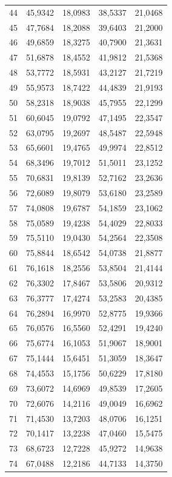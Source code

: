 \begin{small}
\begin{longtable}{rrrrr}
44 & 45,9342 & 18,0983 & 38,5337 & 21,0468 \\
45 & 47,7684 & 18,2088 & 39,6403 & 21,2000 \\
46 & 49,6859 & 18,3275 & 40,7900 & 21,3631 \\
47 & 51,6878 & 18,4552 & 41,9812 & 21,5368 \\
48 & 53,7772 & 18,5931 & 43,2127 & 21,7219 \\
49 & 55,9573 & 18,7422 & 44,4839 & 21,9193 \\
50 & 58,2318 & 18,9038 & 45,7955 & 22,1299 \\
51 & 60,6045 & 19,0792 & 47,1495 & 22,3547 \\
52 & 63,0795 & 19,2697 & 48,5487 & 22,5948 \\
53 & 65,6601 & 19,4765 & 49,9974 & 22,8512 \\
54 & 68,3496 & 19,7012 & 51,5011 & 23,1252 \\
55 & 70,6831 & 19,8139 & 52,7162 & 23,2636 \\
56 & 72,6089 & 19,8079 & 53,6180 & 23,2589 \\
57 & 74,0808 & 19,6787 & 54,1859 & 23,1062 \\
58 & 75,0589 & 19,4238 & 54,4029 & 22,8033 \\
59 & 75,5110 & 19,0430 & 54,2564 & 22,3508 \\
60 & 75,8844 & 18,6542 & 54,0738 & 21,8877 \\
61 & 76,1618 & 18,2556 & 53,8504 & 21,4144 \\
62 & 76,3302 & 17,8467 & 53,5806 & 20,9312 \\
63 & 76,3777 & 17,4274 & 53,2583 & 20,4385 \\
64 & 76,2894 & 16,9970 & 52,8775 & 19,9366 \\
65 & 76,0576 & 16,5560 & 52,4291 & 19,4240 \\
66 & 75,6774 & 16,1053 & 51,9067 & 18,9001 \\
67 & 75,1444 & 15,6451 & 51,3059 & 18,3647 \\
68 & 74,4553 & 15,1756 & 50,6229 & 17,8180 \\
69 & 73,6072 & 14,6969 & 49,8539 & 17,2605 \\
70 & 72,6076 & 14,2116 & 49,0049 & 16,6962 \\
71 & 71,4530 & 13,7203 & 48,0706 & 16,1251 \\
72 & 70,1417 & 13,2238 & 47,0460 & 15,5475 \\
73 & 68,6723 & 12,7228 & 45,9272 & 14,9638 \\
74 & 67,0488 & 12,2186 & 44,7133 & 14,3750 \\

\end{longtable}
\end{small}
